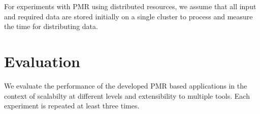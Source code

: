 \documentclass{acm_proc_article-sp}
\begin{document}
 
For experiments with PMR using distributed resources, we assume that
all input and required data are stored initially on a single cluster
to process and measure the time for distributing data.

\section{Evaluation}\label{sec:results}
We evaluate the performance of the developed PMR based applications in the context of scalabilty at different levels and extensibility to multiple tools.
Each experiment is repeated at least three times.




 
\end{document}
